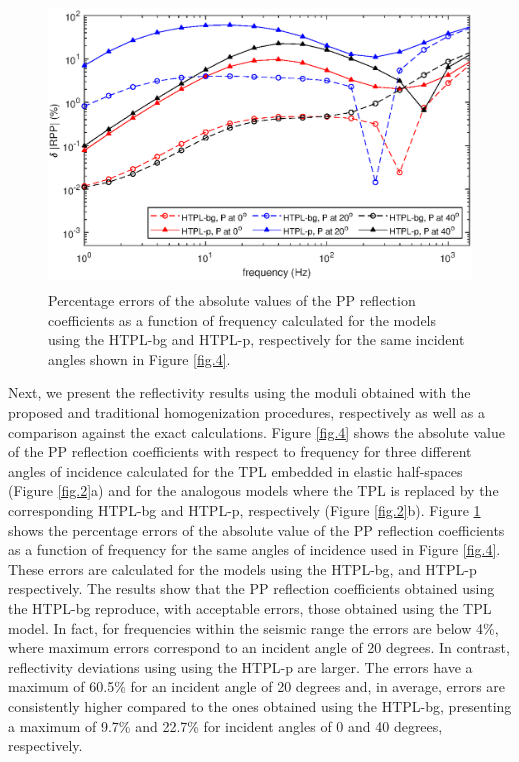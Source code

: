 \documentclass[draft]{agujournal2019}
\begin{document}
\begin{figure}[!ht]
\centering
        \includegraphics[width= 120mm, height=75mm]{rppdif_2sandshale.eps}
\caption{Percentage errors of the absolute values of the PP reflection coefficients as a function of frequency calculated for the models using the HTPL-bg and HTPL-p, respectively
for the same incident angles shown in Figure \ref{fig.4}.}
\label{fig.5}
\end{figure}

Next, we present the reflectivity results using the moduli obtained with the proposed and traditional homogenization procedures, respectively as well as a comparison against the exact calculations. 
Figure \ref{fig.4} shows the absolute value of the PP reflection coefficients with respect to frequency for three different angles of incidence calculated for the TPL embedded in elastic half-spaces (Figure \ref{fig.2}a) and for the analogous models where the TPL is replaced by the corresponding HTPL-bg and HTPL-p, respectively (Figure \ref{fig.2}b).
Figure \ref{fig.5} shows the percentage errors of the absolute value of the PP reflection coefficients as a function of frequency for the same angles of incidence used in Figure \ref{fig.4}. These errors are calculated for the models using the HTPL-bg, and HTPL-p respectively. The results show that the PP reflection coefficients obtained using the HTPL-bg reproduce, with acceptable errors, those obtained using the TPL model. In fact, for frequencies within the seismic range the errors are below 4\%, where maximum errors correspond to an incident angle of 20 degrees. In contrast,
reflectivity deviations using using the HTPL-p are larger. The errors have a maximum of 60.5\% for an incident angle of 20 degrees and, in average, errors are consistently higher compared to the ones obtained using the HTPL-bg, presenting a maximum of 9.7\%  and 22.7\% for incident angles of 0 and 40 degrees, respectively.
\end{document}
